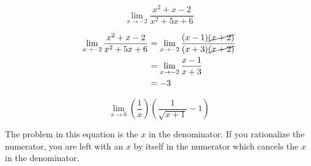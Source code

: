 \documentclass[fleqn,addpoints]{exam}
\begin{document}
\begin{questions}

 

\vspace{1 cm}




\question[5]
\label{limit:first} 
\[
  \lim_{x \to -2} \frac{x^2 + x - 2}{x^2 + 5x + 6}
\]

\begin{solution}[1 cm]

\begin{align*}
  \lim_{x \to -2} \frac{x^2 + x  - 2}{x^2 + 5x + 6} &= \lim_{x \to -2} \frac{(x - 1) \cancel{(x + 2)}}{(x + 3) \cancel{(x + 2)}} \\
  &= \lim_{x \to -2} \frac{x - 1}{x + 3} \\
  &= -3 \\
\end{align*}

\end{solution}


\pagebreak

\question[7]
\label{limit:last}
\[
  \lim_{x \to 0} \left( \frac{1}{x} \right) \left( \frac{1}{\sqrt{x + 1}} - 1 \right)
\]
\begin{solution}[5 cm]
The problem in this equation is the $x$ in the denominator.  If you rationalize the numerator, you are left with an $x$
by itself in the numerator which cancels the $x$ in the denominator.


\end{solution}
\end{questions}
\end{document}
